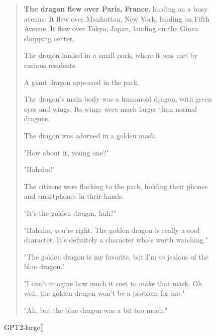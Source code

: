\documentclass{article}
\begin{document}
\begin{figure}
\begin{quote}
\textbf{The dragon flew over Paris, France}, landing on a busy avenue. It flew over Manhattan, New York, landing on Fifth Avenue. It flew over Tokyo, Japan, landing on the Ginza shopping center.

The dragon landed in a small park, where it was met by curious residents.

A giant dragon appeared in the park.

The dragon's main body was a humanoid dragon, with green eyes and wings. Its wings were much larger than normal dragons.

The dragon was adorned in a golden mask.

"How about it, young one?"

"Hahaha!"

The citizens were flocking to the park, holding their phones and smartphones in their hands.

"It's the golden dragon, huh?"

"Hahaha, you're right. The golden dragon is really a cool character. It's definitely a character who's worth watching."

"The golden dragon is my favorite, but I'm so jealous of the blue dragon."

"I can't imagine how much it cost to make that mask. Oh well, the golden dragon won't be a problem for me."

"Ah, but the blue dragon was a bit too much."

\end{quote}
    \caption{GPT2-large[]}
    \label{fig:koala-gpt2-large-cfg=1.5}
\end{figure}
\end{document}
